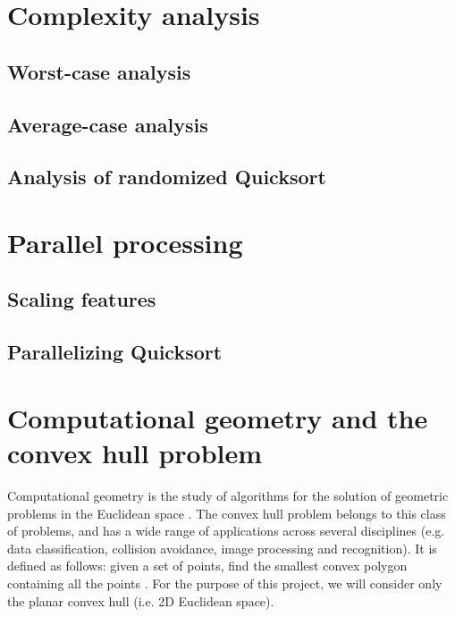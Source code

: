 \documentclass[]{finalproject}
\begin{document}
 


\section{Complexity analysis}
\subsection{Worst-case analysis}
\subsection{Average-case analysis}
\subsection{Analysis of randomized Quicksort}

\section{Parallel processing}
\subsection{Scaling features}
\subsection{Parallelizing Quicksort}

\section{Computational geometry and the convex hull problem}
Computational geometry is the study of algorithms for the solution of geometric problems in the Euclidean space \cite{paper}.
The convex hull problem belongs to this class of problems, and has a wide range of applications across several disciplines
(e.g. data classification, collision avoidance, image processing and recognition). It is defined as follows:
given a set of points, find the smallest convex polygon containing all the points \cite{geowiki}.
For the purpose of this project, we will consider only the planar convex hull (i.e. 2D Euclidean space).
\end{document}
